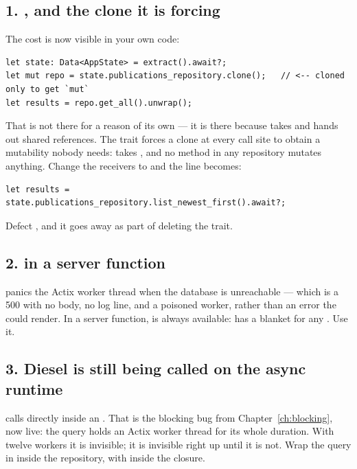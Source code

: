 \subsection{1. , and the clone it is forcing}

The cost is now visible in your own code:

\begin{lstlisting}[style=rs,caption={\file{src/publications/server.rs}}]
let state: Data<AppState> = extract().await?;
let mut repo = state.publications_repository.clone();   // <-- cloned only to get `mut`
let results = repo.get_all().unwrap();
\end{lstlisting}

That  is not there for a reason of its own --- it is there because 
takes  and  hands out shared references. The trait forces a
clone at every call site to obtain a mutability nobody needs:  takes ,
and no method in any repository mutates anything. Change the receivers to  and the line
becomes:

\begin{lstlisting}[style=rs]
let results = state.publications_repository.list_newest_first().await?;
\end{lstlisting}

Defect , and it goes away as part of deleting the trait.

\subsection{2.  in a server function}

 panics the Actix worker thread when the database is unreachable ---
which is a 500 with no body, no log line, and a poisoned worker, rather than an error the
 could render. In a server function,  is always available:
 has a blanket  for any . Use it.

\subsection{3. Diesel is still being called on the async runtime}

 calls  directly inside an . That is the
blocking bug from Chapter~\ref{ch:blocking}, now live: the query holds an Actix worker thread for its
whole duration. With twelve workers it is invisible; it is invisible right up until it is not. Wrap
the query in  inside the repository, with  inside the closure.

